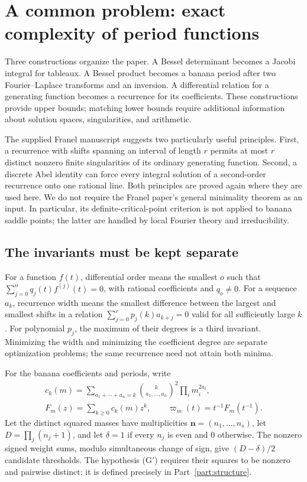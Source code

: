 \documentclass[11pt,a4paper]{article}
\theoremstyle{definition}
\theoremstyle{remark}
\numberwithin{equation}{section}
\begin{document}
\clearpage
\tableofcontents
\clearpage
\section{A common problem: exact complexity of period functions}
\label{sec:overview}

Three constructions organize the paper. A Bessel determinant becomes a
Jacobi integral for tableaux. A Bessel product becomes a banana period after
two Fourier--Laplace transforms and an inversion. A differential relation for
a generating function becomes a recurrence for its coefficients. These
constructions provide upper bounds; matching lower bounds require additional
information about solution spaces, singularities, and arithmetic.

The supplied Franel manuscript \cite{KeioFranel} suggests two particularly
useful principles. First, a recurrence with shifts spanning an interval of
length $r$ permits at most $r$ distinct nonzero finite singularities of its
ordinary generating function. Second, a discrete Abel identity can force
every integral solution of a second-order recurrence onto one rational line.
Both principles are proved again where they are used here. We do not require
the Franel paper's general minimality theorem as an input. In particular, its
definite-critical-point criterion is not applied to banana saddle points;
the latter are handled by local Fourier theory and irreducibility.

\subsection{The invariants must be kept separate}
For a function $f(t)$, differential order means the smallest $o$ such that
$\sum_{j=0}^{o}q_j(t)f^{(j)}(t)=0$, with rational coefficients and $q_o\ne0$.
For a sequence $a_k$, recurrence width means the smallest difference between
the largest and smallest shifts in a relation
$\sum_{j=0}^{r}p_j(k)a_{k+j}=0$ valid for all sufficiently large $k$.
For polynomial $p_j$, the maximum of their degrees is a third invariant.
Minimizing the width and minimizing the coefficient degree are separate
optimization problems; the same recurrence need not attain both minima.

For the banana coefficients and periods, write
\begin{gather*}
 c_k(m)=\sum_{a_1+\cdots+a_n=k}\binom{k}{a_1,\ldots,a_n}^{\!2}
             \prod_i m_i^{2a_i},\\
 F_m(z)=\sum_{k\ge0}c_k(m)z^k,\qquad
 \varpi_m(t)=t^{-1}F_m(t^{-1}).
\end{gather*}
Let the distinct squared masses have multiplicities
$\boldsymbol n=(n_1,\ldots,n_s)$, let
$D=\prod_j(n_j+1)$, and let $\delta=1$ if every $n_j$ is even and $0$ otherwise.
The nonzero signed weight sums, modulo simultaneous change of sign, give
$(D-\delta)/2$ candidate thresholds. The hypothesis (G$'$) requires their
squares to be nonzero and pairwise distinct; it is defined precisely in
Part~\ref{part:structure}.
\end{document}
